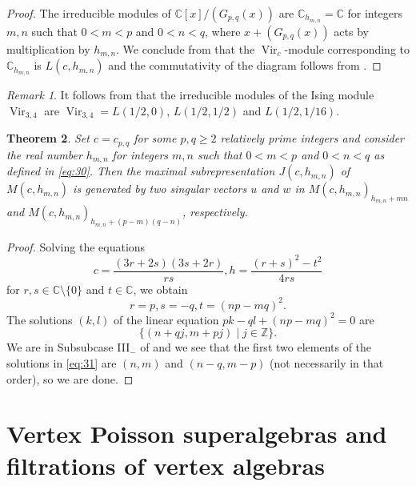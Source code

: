 \documentclass[a4paper, 12pt, reqno]{amsart}
\newtheorem{theorem}{Theorem}[section]
\theoremstyle{remark}
\newtheorem{remark}[theorem]{Remark}
\numberwithin{equation}{subsection}
\DeclareMathOperator{\Vir}{Vir}
\begin{document}
\begin{proof}
  The irreducible modules of $\mathbb{C}[x]/(G_{p, q}(x))$ are $\mathbb{C}_{h_{m, n}} = \mathbb{C}$ for integers $m, n$ such that $0 < m < p$ and $0 < n < q$, where $x + (G_{p, q}(x))$ acts by multiplication by $h_{m, n}$.
  We conclude from  that the $\Vir_c$-module corresponding to $\mathbb{C}_{h_{m, n}}$ is $L(c, h_{m, n})$ and the commutativity of the diagram follows from .
\end{proof}

\begin{remark}
  \label{rmk:32}
  It follows from  that the irreducible modules of the Ising module $\Vir_{3, 4}$ are $\Vir_{3, 4} = L(1/2, 0)$, $L(1/2, 1/2)$ and $L(1/2, 1/16)$.
\end{remark}

\begin{theorem}
  \label{thr:41}
  Set $c = c_{p, q}$ for some $p, q \ge 2$ relatively prime integers and consider the real number $h_{m, n}$ for integers $m, n$ such that $0 < m < p$ and $0 < n < q$ as defined in \eqref{eq:30}.
  Then the maximal subrepresentation $J(c, h_{m, n})$ of $M(c, h_{m, n})$ is generated by two singular vectors $u$ and $w$ in $M(c, h_{m, n})_{h_{m, n} + mn}$ and $M(c, h_{m, n})_{h_{m, n} + (p - m)(q - n)}$, respectively.
\end{theorem}

\begin{proof}
  Solving the equations
  \begin{equation*}
    c = \frac{(3r + 2s)(3s + 2r)}{rs}, h = \frac{(r + s)^2 - t^2}{4rs}
  \end{equation*}
  for $r, s \in \mathbb{C} \setminus \{0\}$ and $t \in \mathbb{C}$, we obtain
  \begin{equation*}
    r = p, s = -q, t = (np - mq)^2.
  \end{equation*}
  The solutions $(k, l)$ of the linear equation $pk - ql + (np - mq)^2 = 0$ are
  \begin{equation}
    \label{eq:31}
    \{(n + qj, m + pj) \mid j \in \mathbb{Z}\}.
  \end{equation}
  We are in Subsubcase III$_-$ of  and we see that the first two elements of the solutions in \eqref{eq:31} are $(n, m)$ and $(n - q, m - p)$ (not necessarily in that order), so we are done.
\end{proof}

\section{Vertex Poisson superalgebras and filtrations of vertex algebras}
\label{sec:vert-poiss-supera}
\end{document}
